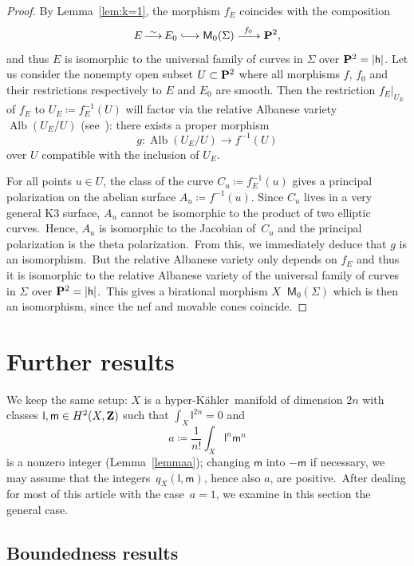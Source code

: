 \documentclass[12pt]{amsart}
\def\Z{{\bf Z}}
\def\P{{\bf P}}
\DeclareMathOperator{\Alb}{Alb}
\def\lra{\longrightarrow}
\def\dra{\dashrightarrow}
\def\lhra{\ensuremath{\lhook\joinrel\relbar\joinrel\to}}
\DeclareMathOperator{\isomdra}{\stackrel{{}_{\scriptstyle\sim}}{\dra}}
\DeclareMathOperator{\isomlra}{\stackrel{{}_{\scriptstyle\sim}}{\lra}}
\def\hk{hyper-K\"ahler}
\theoremstyle{remark}
\def\hh{\ensuremath{\mathsf h}}
\def\lll{\ensuremath{\mathsf l}}
\def\mm{\ensuremath{\mathsf m}}
\def\M{\ensuremath{\mathsf M}}
\begin{document}
\begin{proof}
By Lemma~\ref{lem:k=1}, the morphism $f_E$ coincides with the composition
\[
E \isomlra E_0 \lhra \M_0(\Sigma) \xrightarrow{\ f_0\ } \P^2,
\]
and thus $E$ is isomorphic to the universal family of curves in $\Sigma$ over $\P^2=|\hh |$.
Let us consider the nonempty open subset $U\subset\P^2$ where all morphisms $f$, $f_0$ and their restrictions respectively to $E$ and $E_0$ are smooth.
Then the restriction $f_E \vert_{U_E}$ of $f_E$ to $U_E\coloneqq f_E^{-1}(U)$ will factor via the relative Albanese variety $\Alb (U_E/U)$ (see~\cite[Proposition 1]{fujiki}): there exists a proper morphism
\[
g\colon \Alb (U_E/U) \lra f^{-1}(U)
\]
over $U$ compatible with the inclusion of $U_E$.

For all points $u\in U$, the class of the curve $C_u\coloneqq f_E^{-1}(u)$ gives a principal polarization on the abelian surface $A_u\coloneqq f^{-1}(u)$.
Since $C_u$ lives in a very general K3 surface, $A_u$ cannot be isomorphic to the product of two elliptic curves.\
Hence, $A_u$ is isomorphic to the Jacobian of~$C_u$ and the principal polarization is the theta polarization.\
From this, we immediately deduce that $g$ is an isomorphism.\
But the relative Albanese variety only depends on $f_E$ and thus it is isomorphic to the relative Albanese variety of the universal family of curves in $\Sigma$ over $\P^2=|\hh |$.\
This gives a birational morphism $X \isomdra  \M_0(\Sigma)$ which is then an isomorphism, since the nef and movable cones coincide.
\end{proof}



\section{Further results}\label{sec:further}
We keep the same setup: $X$ is a \hk\ manifold of dimension $2n$ with classes $\lll,\mm\in H^2(X,\Z)$ such that $\int_X\lll^{2n}=0$ and
$$a\coloneqq \frac 1{n!} \int_X\lll^n\mm^n$$
is a nonzero integer (Lemma~\ref{lemmaa});  changing $\mm$ into $-\mm$ if necessary, we may assume that the integers~$q_X(\lll,\mm)$, hence also $a$, are positive.\ After dealing for most of   this article  with the case~$a=1$, we examine in this section the general case.

\subsection{Boundedness results}
\end{document}
